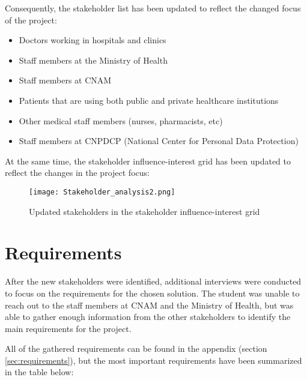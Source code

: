 Consequently, the stakeholder list has been updated to reflect the changed focus of the project:
\begin{itemize}
    \item Doctors working in hospitals and clinics
    \item Staff members at the Ministry of Health
    \item Staff members at CNAM
    \item Patients that are using both public and private healthcare institutions
    \item Other medical staff members (nurses, pharmacists, etc)
    \item Staff members at CNPDCP (National Center for Personal Data Protection)
\end{itemize}

At the same time, the stakeholder influence-interest grid has been updated to reflect the changes in the project focus:

\begin{figure}[ht]
    \centering
    \texttt{[image: Stakeholder\_analysis2.png]}
    \caption{Updated stakeholders in the stakeholder influence-interest grid}
    \label{fig:stakeholder_analysis2}
\end{figure}

\clearpage

\section{Requirements}

After the new stakeholders were identified, additional interviews were conducted to focus on the requirements for the chosen solution. The student was unable to reach out to the staff members at CNAM and the Ministry of Health, but was able to gather enough information from the other stakeholders to identify the main requirements for the project.

All of the gathered requirements can be found in the appendix (section \ref{sec:requirements}), but the most important requirements have been summarized in the table below:

